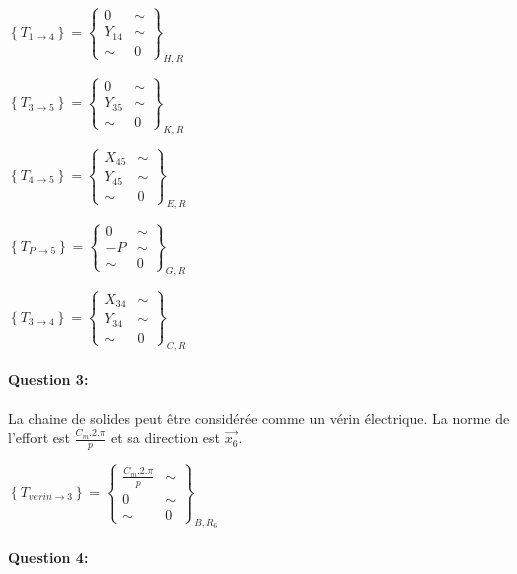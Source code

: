 $\left\{T_{1\rightarrow 4}\right\}=\left\{
\begin{array}{cc}
0 & \sim \\
Y_{14} & \sim \\
\sim & 0
\end{array}
\right\}_{H,R}$

$\left\{T_{3\rightarrow 5}\right\}=\left\{
\begin{array}{cc}
0 & \sim \\
Y_{35} & \sim \\
\sim & 0
\end{array}
\right\}_{K,R}$

$\left\{T_{4\rightarrow 5}\right\}=\left\{
\begin{array}{cc}
X_{45} & \sim \\
Y_{45} & \sim \\
\sim & 0
\end{array}
\right\}_{E,R}$

$\left\{T_{P\rightarrow 5}\right\}=\left\{
\begin{array}{cc}
0 & \sim \\
-P & \sim \\
\sim & 0
\end{array}
\right\}_{G,R}$

$\left\{T_{3\rightarrow 4}\right\}=\left\{
\begin{array}{cc}
X_{34} & \sim \\
Y_{34} & \sim \\
\sim & 0
\end{array}
\right\}_{C,R}$

\paragraph{Question 3:}

La chaine de solides peut être considérée comme un vérin électrique. La norme de l'effort est $\frac{C_m.2.\pi}{p}$ et sa direction est $\overrightarrow{x_6}$.

$\left\{T_{verin \rightarrow 3}\right\}=\left\{
\begin{array}{cc}
\frac{C_m.2.\pi}{p} & \sim \\
0 & \sim \\
\sim & 0
\end{array}
\right\}_{B,R_6}$


\paragraph{Question 4:}

